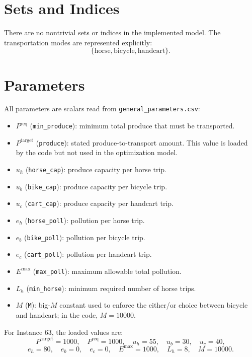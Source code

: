 \section*{Sets and Indices}

There are no nontrivial sets or indices in the implemented model. The transportation modes are represented explicitly:
\[
\{\text{horse},\text{bicycle},\text{handcart}\}.
\]

\section*{Parameters}

All parameters are scalars read from \texttt{general\_parameters.csv}:

\begin{itemize}
    \item $P^{\text{req}}$ (\texttt{min\_produce}): minimum total produce that must be transported.
    \item $P^{\text{target}}$ (\texttt{produce}): stated produce-to-transport amount. This value is loaded by the code but not used in the optimization model.
    \item $u_h$ (\texttt{horse\_cap}): produce capacity per horse trip.
    \item $u_b$ (\texttt{bike\_cap}): produce capacity per bicycle trip.
    \item $u_c$ (\texttt{cart\_cap}): produce capacity per handcart trip.
    \item $e_h$ (\texttt{horse\_poll}): pollution per horse trip.
    \item $e_b$ (\texttt{bike\_poll}): pollution per bicycle trip.
    \item $e_c$ (\texttt{cart\_poll}): pollution per handcart trip.
    \item $E^{\max}$ (\texttt{max\_poll}): maximum allowable total pollution.
    \item $L_h$ (\texttt{min\_horse}): minimum required number of horse trips.
    \item $M$ (\texttt{M}): big-\(M\) constant used to enforce the either/or choice between bicycle and handcart; in the code, \(M=10000\).
\end{itemize}

For Instance 63, the loaded values are:
\[
P^{\text{target}}=1000,\quad P^{\text{req}}=1000,\quad
u_h=55,\quad u_b=30,\quad u_c=40,
\]
\[
e_h=80,\quad e_b=0,\quad e_c=0,\quad
E^{\max}=1000,\quad L_h=8,\quad M=10000.
\]

